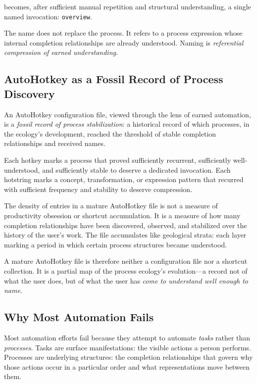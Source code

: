 \documentclass[12pt, a4paper]{article}
\begin{document}
becomes, after sufficient manual repetition and structural
understanding, a single named invocation: \texttt{overview}.

The name does not replace the process. It refers to a process
expression whose internal completion relationships are already
understood. Naming is \emph{referential compression of earned
understanding}.

\subsection{AutoHotkey as a Fossil Record of Process Discovery}

An AutoHotkey configuration file, viewed through the lens of earned
automation, is a \emph{fossil record of process stabilization}: a
historical record of which processes, in the ecology's development,
reached the threshold of stable completion relationships and received
names.

Each hotkey marks a process that proved sufficiently recurrent,
sufficiently well-understood, and sufficiently stable to deserve a
dedicated invocation. Each hotstring marks a concept, transformation,
or expression pattern that recurred with sufficient frequency and
stability to deserve compression.

The density of entries in a mature AutoHotkey file is not a measure
of productivity obsession or shortcut accumulation. It is a measure
of how many completion relationships have been discovered, observed,
and stabilized over the history of the user's work. The file
accumulates like geological strata: each layer marking a period in
which certain process structures became understood.

A mature AutoHotkey file is therefore neither a configuration file
nor a shortcut collection. It is a partial map of the process
ecology's evolution---a record not of what the user does, but of
what the user has \emph{come to understand well enough to name}.

\subsection{Why Most Automation Fails}

Most automation efforts fail because they attempt to automate
\emph{tasks} rather than \emph{processes}. Tasks are surface
manifestations: the visible actions a person performs. Processes
are underlying structures: the completion relationships that
govern why those actions occur in a particular order and what
representations move between them.
\end{document}

